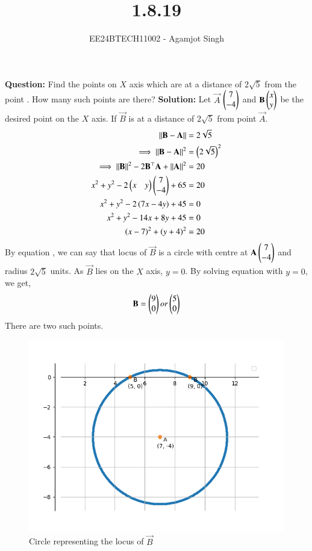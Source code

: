 \documentclass[journal]{IEEEtran}
\begin{document}

\vspace{3cm}

\title{1.8.19}
\author{EE24BTECH11002 - Agamjot Singh}
{\let\newpage\relax\maketitle}
\renewcommand{\thefigure}{\theenumi}
\renewcommand{\thetable}{\theenumi}
\setlength{\intextsep}{10pt} %

\textbf{Question:}
\newline
Find the points on $X$ axis which are at a distance of $2\sqrt{5}$ from the point . How many such points are there?
\newline
\textbf{Solution:}
\newline
Let $\vec{A}$ $\begin{pmatrix}7\\-4\end{pmatrix}$ and $\mathbf{B} \begin{pmatrix}x\\y\end{pmatrix}$ be the desired point on the $X$ axis.
\newline
If $\vec{B}$ is at a distance of $2\sqrt{5}$ from point $\vec{A}$.
\begin{align}
	\left\lVert\mathbf{B} - \mathbf{A}\right\rVert &= 2\sqrt{5}\\
	\implies \left\lVert\mathbf{B} - \mathbf{A}\right\rVert^2 &= \left(2\sqrt{5}\right)^2\\
	\implies \left\lVert\mathbf{B}\right\rVert^2 - 2\mathbf{B}^\top \mathbf{A} + \left\lVert\mathbf{A}\right\rVert^2 &= 20\\
	x^2 + y^2 - 2\begin{pmatrix}x&y\end{pmatrix}\begin{pmatrix}7\\-4\end{pmatrix} + 65 &= 20\\
	x^2 + y^2 - 2\left(7x - 4y\right) + 45 &= 0\\
	x^2 + y^2 - 14x + 8y + 45 &= 0\\
	\left(x-7\right)^2 + \left(y+4\right)^2 &= 20
\end{align}
By equation , we can say that locus of $\vec{B}$ is a circle with centre at $\mathbf{A}\begin{pmatrix}7\\-4\end{pmatrix}$ and radius $2\sqrt{5}$ units.
\newline
As $\vec{B}$ lies on the $X$ axis, $y = 0$.
By solving equation  with $y = 0$, we get,
\begin{align}
	\mathbf{B} = \begin{pmatrix}9\\0\end{pmatrix} or \begin{pmatrix}5\\0\end{pmatrix}
\end{align} 
There are two such points.

\begin{figure}[h!]
   \centering
   \includegraphics[width=0.7\linewidth]{figs/graph.png}
   \caption{Circle representing the locus of $\vec{B}$}
\end{figure}
\end{document}
